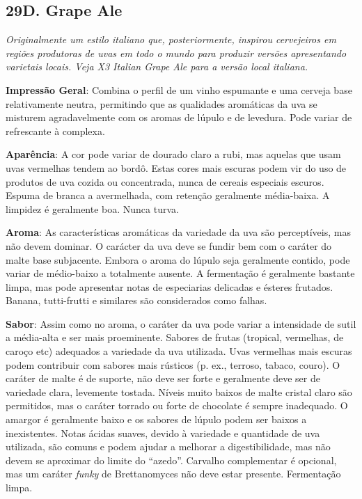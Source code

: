 \subsection*{29D. Grape Ale}
\textit{Originalmente um estilo italiano que, posteriormente, inspirou cervejeiros em regiões produtoras de uvas em todo o mundo para produzir versões apresentando varietais locais. Veja X3 Italian Grape Ale para a versão local italiana.}

\textbf{Impressão Geral}: Combina o perfil de um vinho espumante e uma cerveja base relativamente neutra, permitindo que as qualidades aromáticas da uva se misturem agradavelmente com os aromas de lúpulo e de levedura. Pode variar de refrescante à complexa.

\textbf{Aparência}: A cor pode variar de dourado claro a rubi, mas aquelas que usam uvas vermelhas tendem ao bordô. Estas cores mais escuras podem vir do uso de produtos de uva cozida ou concentrada, nunca de cereais especiais escuros. Espuma de branca a avermelhada, com retenção geralmente média-baixa. A limpidez é geralmente boa. Nunca turva.

\textbf{Aroma}: As características aromáticas da variedade da uva são perceptíveis, mas não devem dominar. O carácter da uva deve se fundir bem com o caráter do malte base subjacente. Embora o aroma do lúpulo seja geralmente contido, pode variar de médio-baixo a totalmente ausente. A fermentação é geralmente bastante limpa, mas pode apresentar notas de especiarias delicadas e ésteres frutados. Banana, tutti-frutti e similares são considerados como falhas.

\textbf{Sabor}: Assim como no aroma, o caráter da uva pode variar a intensidade de sutil a média-alta e ser mais proeminente. Sabores de frutas (tropical, vermelhas, de caroço etc) adequados a variedade da uva utilizada. Uvas vermelhas mais escuras podem contribuir com sabores mais rústicos (p. ex., terroso, tabaco, couro). O caráter de malte é de suporte, não deve ser forte e geralmente deve ser de variedade clara, levemente tostada. Níveis muito baixos de malte cristal claro são permitidos, mas o caráter torrado ou forte de chocolate é sempre inadequado. O amargor é geralmente baixo e os sabores de lúpulo podem ser baixos a inexistentes. Notas ácidas suaves, devido à variedade e quantidade de uva utilizada, são comuns e podem ajudar a melhorar a digestibilidade, mas não devem se aproximar do limite do “azedo”. Carvalho complementar é opcional, mas um caráter \textit{funky} de Brettanomyces não deve estar presente. Fermentação limpa.

